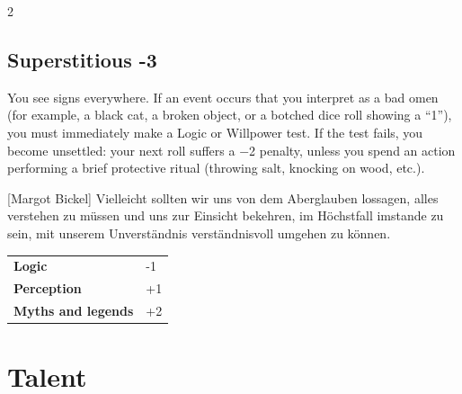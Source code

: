 \begin{multicols}{2}
\begin{tcolorbox}

\end{tcolorbox}

\begin{tcolorbox}
    \subsection*{Superstitious \hfill \small{-3 }}
    \tcblower
You see signs everywhere. If an event occurs that you interpret as a bad omen (for example, a black cat, a broken object, or a botched dice roll showing a “1”), you must immediately make a Logic or Willpower test. If the test fails, you become unsettled: your next roll suffers a −2 penalty, unless you spend an action performing a brief protective ritual (throwing salt, knocking on wood, etc.).

\begin{pquote}{[Margot Bickel]}
Vielleicht sollten wir uns von dem Aberglauben lossagen, alles verstehen zu müssen und uns zur Einsicht bekehren, im Höchstfall imstande zu sein, mit unserem Unverständnis verständnisvoll umgehen zu können.
\end{pquote}

\vspace{3mm}

\begin{tabular}{@{}ll@{}}
    \textbf{Logic} & -1\\
    \textbf{Perception} & +1\\
    \textbf{Myths and legends} & +2\\
\end{tabular}


\end{tcolorbox}

\section{Talent}


\end{multicols}
